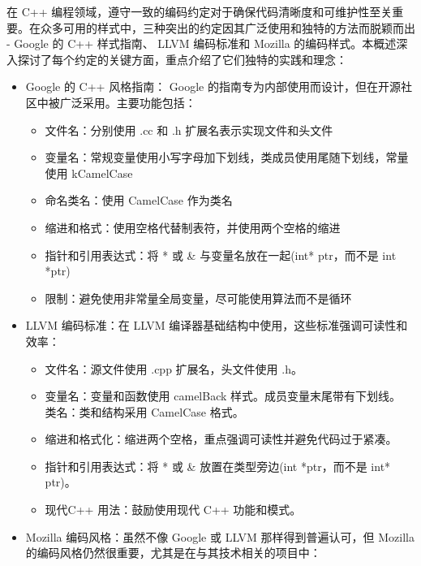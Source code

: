 在 C++ 编程领域，遵守一致的编码约定对于确保代码清晰度和可维护性至关重要。在众多可用的样式中，三种突出的约定因其广泛使用和独特的方法而脱颖而出 - Google 的 C++ 样式指南、 LLVM 编码标准和 Mozilla 的编码样式。本概述深入探讨了每个约定的关键方面，重点介绍了它们独特的实践和理念：

\begin{itemize}
\item
Google 的 C++ 风格指南： Google 的指南专为内部使用而设计，但在开源社区中被广泛采用。主要功能包括：
\begin{itemize}
\item
文件名：分别使用 .cc 和 .h 扩展名表示实现文件和头文件

\item
变量名：常规变量使用小写字母加下划线，类成员使用尾随下划线，常量使用 kCamelCase

\item
命名类名：使用 CamelCase 作为类名

\item
缩进和格式：使用空格代替制表符，并使用两个空格的缩进

\item
指针和引用表达式：将 * 或 \& 与变量名放在一起(int* ptr，而不是 int *ptr)

\item
限制：避免使用非常量全局变量，尽可能使用算法而不是循环
\end{itemize}

\item
LLVM 编码标准：在 LLVM 编译器基础结构中使用，这些标准强调可读性和效率：

\begin{itemize}
\item
文件名：源文件使用 .cpp 扩展名，头文件使用 .h。

\item
变量名：变量和函数使用 camelBack 样式。成员变量末尾带有下划线。 类名：类和结构采用 CamelCase 格式。

\item
缩进和格式化：缩进两个空格，重点强调可读性并避免代码过于紧凑。

\item
指针和引用表达式：将 * 或 \& 放置在类型旁边(int *ptr，而不是 int* ptr)。

\item
现代C++ 用法：鼓励使用现代 C++ 功能和模式。
\end{itemize}

\item
Mozilla 编码风格：虽然不像 Google 或 LLVM 那样得到普遍认可，但 Mozilla 的编码风格仍然很重要，尤其是在与其技术相关的项目中：


\end{itemize}
